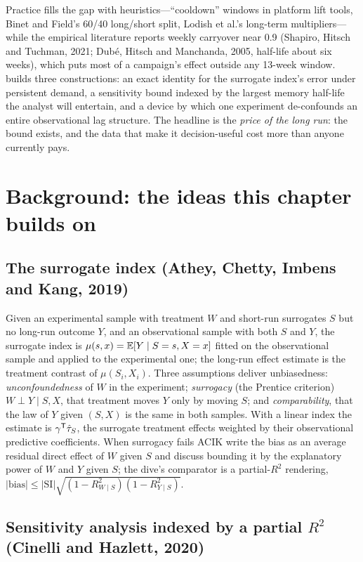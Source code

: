 Practice fills the gap with heuristics---``cooldown'' windows in platform lift tools, Binet and Field's 60/40 long/short split, Lodish et al.'s long-term multipliers---while the empirical literature reports weekly carryover near 0.9 (Shapiro, Hitsch and Tuchman, 2021; Dub\'e, Hitsch and Manchanda, 2005, half-life about six weeks), which puts most of a campaign's effect outside any 13-week window.  builds three constructions: an exact identity for the surrogate index's error under persistent demand, a sensitivity bound indexed by the largest memory half-life the analyst will entertain, and a device by which one experiment de-confounds an entire observational lag structure. The headline is the \emph{price of the long run}: the bound exists, and the data that make it decision-useful cost more than anyone currently pays.

\section{Background: the ideas this chapter builds on}

\subsection{The surrogate index (Athey, Chetty, Imbens and Kang, 2019)}

Given an experimental sample with treatment $W$ and short-run surrogates $S$ but no long-run outcome $Y$, and an observational sample with both $S$ and $Y$, the surrogate index is $\mu(s, x) = \mathbb{E}[Y \mid S = s, X = x]$ fitted on the observational sample and applied to the experimental one; the long-run effect estimate is the treatment contrast of $\mu(S_i, X_i)$. Three assumptions deliver unbiasedness: \emph{unconfoundedness} of $W$ in the experiment; \emph{surrogacy} (the Prentice criterion) $W \perp Y \mid S, X$, that treatment moves $Y$ only by moving $S$; and \emph{comparability}, that the law of $Y$ given $(S, X)$ is the same in both samples. With a linear index the estimate is $\gamma^{\mathsf{T}}\hat\tau_S$, the surrogate treatment effects weighted by their observational predictive coefficients. When surrogacy fails ACIK write the bias as an average residual direct effect of $W$ given $S$ and discuss bounding it by the explanatory power of $W$ and $Y$ given $S$; the dive's comparator is a partial-$R^2$ rendering, $|\text{bias}| \le |\mathrm{SI}|\sqrt{(1 - R^2_{W \mid S})(1 - R^2_{Y \mid S})}$.

\subsection{Sensitivity analysis indexed by a partial $R^2$ (Cinelli and Hazlett, 2020)}

